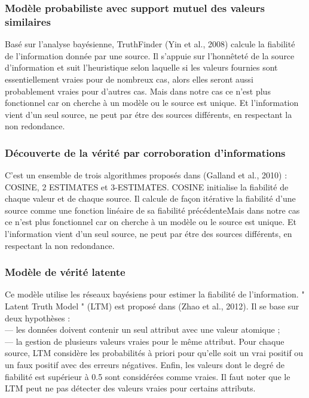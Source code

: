 \documentclass[12pt]{report}
\begin{document}
\subsubsection{Modèle probabiliste avec support mutuel des valeurs similaires}

Basé sur l’analyse bayésienne, TruthFinder (Yin et al., 2008) calcule la
fiabilité de l’information donnée par une source. Il s’appuie sur l’honnêteté
de la source d’information et suit l’heuristique selon laquelle si les valeurs
fournies sont essentiellement vraies pour de nombreux cas, alors elles
seront aussi probablement vraies pour d’autres cas. Mais dans notre cas ce n’est plus fonctionnel car on cherche à un modèle ou le source est unique.
Et l’information vient d’un seul source, ne peut par étre des sources
différents, en respectant la non redondance\cite{47}.


\subsubsection{Découverte de la vérité par corroboration d’informations}

C’est un ensemble de trois algorithmes proposés dans (Galland et al.,
2010) : COSINE, 2 ESTIMATES et 3-ESTIMATES. COSINE initialise la
fiabilité de chaque valeur et de chaque source. Il calcule de façon itérative
la fiabilité d’une source comme une fonction linéaire de sa fiabilité
précédenteMais dans notre cas ce n’est plus fonctionnel car on cherche à
un modèle ou le source est unique. Et l’information vient d’un seul source,
ne peut par étre des sources différents, en respectant la non redondance\cite{48}.

\subsubsection{Modèle de vérité latente}

Ce modèle utilise les réseaux bayésiens pour estimer la fiabilité de
l’information. " Latent Truth Model " (LTM) est proposé dans (Zhao et al.,
2012). Il se base sur deux hypothèses :
\\— les données doivent contenir un seul attribut avec une valeur atomique ;
\\— la gestion de plusieurs valeurs vraies pour le même attribut.
Pour chaque source, LTM considère les probabilités à priori pour qu’elle
soit un vrai positif ou un faux positif avec des erreurs négatives. Enfin, les
valeurs dont le degré de fiabilité est supérieur à 0.5 sont considérées
comme vraies. Il faut noter que le LTM peut ne pas détecter des valeurs
vraies pour certains attributs\cite{49}.
\end{document}
